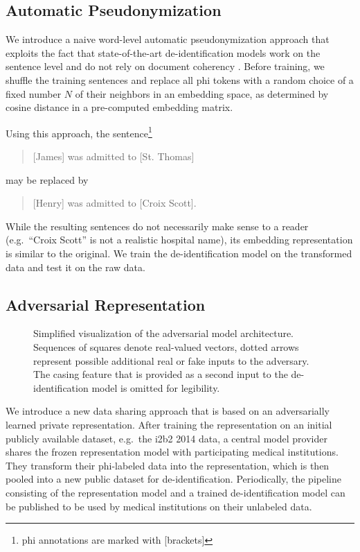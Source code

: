 \subsection{Automatic Pseudonymization}\label{sec:automatic-pseudonymization}
%
We introduce a naive word-level automatic pseudonymization approach that exploits the fact that state-of-the-art de-identification models work on the sentence level and do not rely on document coherency \citep{liu2017identification,dernoncourt2017identification}.
%
Before training, we shuffle the training sentences and replace all \ac{phi} tokens with a random choice of a fixed number $N$ of their neighbors in an embedding space, as determined by cosine distance in a pre-computed embedding matrix.

%
Using this approach, the sentence\footnote{\ac{phi} annotations are marked with [brackets]}
%
\begin{quote}
    [James] was admitted to [St. Thomas]
\end{quote}
%
may be replaced by
\begin{quote}
    [Henry] was admitted to [Croix Scott].
\end{quote}
%
While the resulting sentences do not necessarily make sense to a reader (e.g.\ ``Croix Scott'' is not a realistic hospital name), its embedding representation is similar to the original.
%
We train the de-identification model on the transformed data and test it on the raw data.


\subsection{Adversarial Representation}\label{sec:adversarial-representation}

\begin{figure}
    \centering
    
    \caption[Adversarial model architecture]{%
        Simplified visualization of the adversarial model architecture.
        Sequences of squares denote real-valued vectors, dotted arrows represent possible additional real or fake inputs to the adversary.
        The casing feature that is provided as a second input to the de-identification model is omitted for legibility.}\label{fig:adversarial-model}
\end{figure}

%
We introduce a new data sharing approach that is based on an adversarially learned private representation.
%
After training the representation on an initial publicly available dataset, e.g.\ the i2b2 2014 data, a central model provider shares the frozen representation model with participating medical institutions.
%
They transform their \ac{phi}-labeled data into the representation, which is then pooled into a new public dataset for de-identification.
%
Periodically, the pipeline consisting of the representation model and a trained de-identification model can be published to be used by medical institutions on their unlabeled data.

